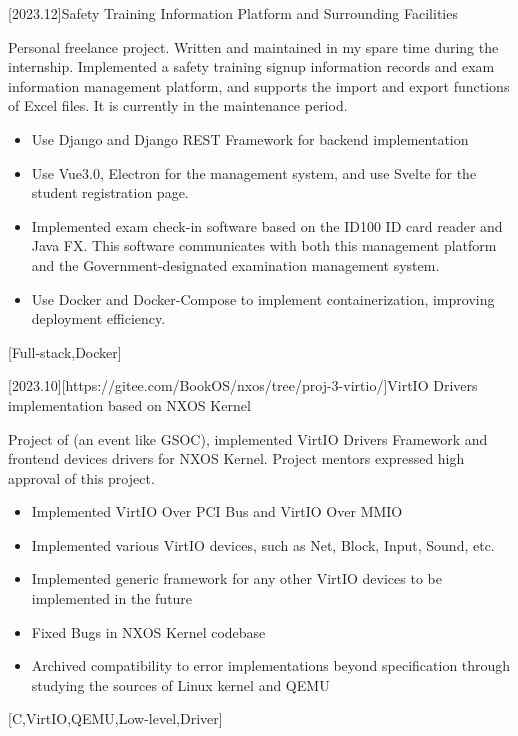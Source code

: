 \documentclass[en]{resume}
\begin{document}
\begin {projects}
	[2023.12]{Safety Training Information Platform and Surrounding Facilities}{
		Personal freelance project. Written and maintained in my spare time during the internship. Implemented a safety training signup information records and exam information management platform, and supports the import and export functions of Excel files. It is currently in the maintenance period.
		\begin{itemize}
			\item Use Django and Django REST Framework for backend implementation
			\item Use Vue3.0, Electron for the management system, and use Svelte for the student registration page.
			\item Implemented exam check-in software based on the ID100 ID card reader and Java FX. This software communicates with both this management platform and the Government-designated examination management system.
			\item Use Docker and Docker-Compose to implement containerization, improving deployment efficiency.
		\end{itemize}
	}[Full-stack,Docker]

	[2023.10][https://gitee.com/BookOS/nxos/tree/proj-3-virtio/]{VirtIO Drivers implementation based on NXOS Kernel}{
		Project of  (an event like GSOC), implemented VirtIO Drivers Framework and frontend devices drivers for NXOS Kernel. Project mentors expressed high approval of this project.
		\begin{itemize}
			\item Implemented VirtIO Over PCI Bus and VirtIO Over MMIO
			\item Implemented various VirtIO devices, such as Net, Block, Input, Sound, etc.
			\item Implemented generic framework for any other VirtIO devices to be implemented in the future
			\item Fixed Bugs in NXOS Kernel codebase
			\item Archived compatibility to error implementations beyond specification through studying the sources of Linux kernel and QEMU
		\end{itemize}
	}[C,VirtIO,QEMU,Low-level,Driver]


\end{projects}
\end{document}
